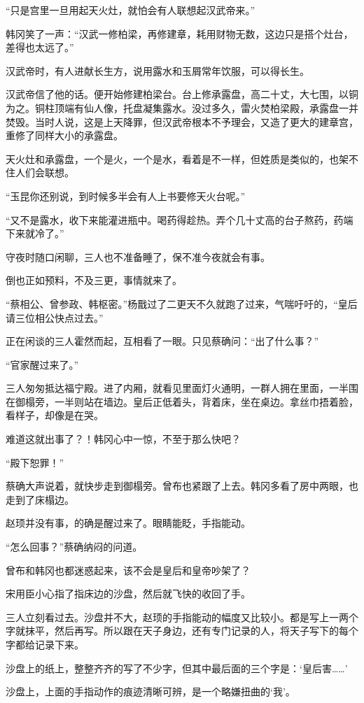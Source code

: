 “只是宫里一旦用起天火灶，就怕会有人联想起汉武帝来。”

韩冈笑了一声：“汉武一修柏梁，再修建章，耗用财物无数，这边只是搭个灶台，差得也太远了。”

汉武帝时，有人进献长生方，说用露水和玉屑常年饮服，可以得长生。

汉武帝信了他的话。便开始修建柏梁台。台上修承露盘，高二十丈，大七围，以铜为之。铜柱顶端有仙人像，托盘凝集露水。没过多久，雷火焚柏梁殿，承露盘一并焚毁。当时人说，这是上天降罪，但汉武帝根本不予理会，又造了更大的建章宫，重修了同样大小的承露盘。

天火灶和承露盘，一个是火，一个是水，看着是不一样，但姓质是类似的，也架不住人们会联想。

“玉昆你还别说，到时候多半会有人上书要修天火台呢。”

“又不是露水，收下来能灌进瓶中。喝药得趁热。弄个几十丈高的台子熬药，药端下来就冷了。”

守夜时随口闲聊，三人也不准备睡了，保不准今夜就会有事。

倒也正如预料，不及三更，事情就来了。

“蔡相公、曾参政、韩枢密。”杨戬过了二更天不久就跑了过来，气喘吁吁的，“皇后请三位相公快点过去。”

正在闲谈的三人霍然而起，互相看了一眼。只见蔡确问：“出了什么事？”

“官家醒过来了。”

三人匆匆抵达福宁殿。进了内厢，就看见里面灯火通明，一群人拥在里面，一半围在御榻旁，一半则站在墙边。皇后正低着头，背着床，坐在桌边。拿丝巾捂着脸，看样子，却像是在哭。

难道这就出事了？！韩冈心中一惊，不至于那么快吧？

“殿下恕罪！”

蔡确大声说着，就快步走到御榻旁。曾布也紧跟了上去。韩冈多看了房中两眼，也走到了床榻边。

赵顼并没有事，的确是醒过来了。眼睛能眨，手指能动。

“怎么回事？”蔡确纳闷的问道。

曾布和韩冈也都迷惑起来，该不会是皇后和皇帝吵架了？

宋用臣小心指了指床边的沙盘，然后就飞快的收回了手。

三人立刻看过去。沙盘并不大，赵顼的手指能动的幅度又比较小。都是写上一两个字就抹平，然后再写。所以跟在天子身边，还有专门记录的人，将天子写下的每个字都给记录下来。

沙盘上的纸上，整整齐齐的写了不少字，但其中最后面的三个字是：‘皇后害……’

沙盘上，上面的手指动作的痕迹清晰可辨，是一个略嫌扭曲的‘我’。

